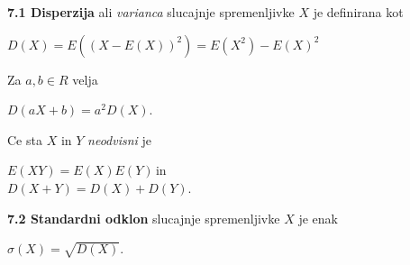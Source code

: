 \documentclass{article}
\begin{document}
\begin{multicols}{3}
\textbf{7.1 Disperzija} ali \textit{varianca} slucajnje spremenljivke $X$
je definirana kot
\begin{center}
    \begin{math}
        D(X) = E((X - E(X))^2) = E(X^2) - E(X)^2
    \end{math}
\end{center}
Za $a, b \in R$ velja
\begin{center}
    \begin{math}
        D(aX + b) = a^2 D(X)
    \end{math}.
\end{center} 
Ce sta $X$ in $Y$ \textit{neodvisni} je 
\begin{center}
    \begin{small}
        \begin{math}
            E(XY) = E(X)E(Y)\,
        \end{math}in \\
        \begin{math}
            D(X + Y) = D(X) + D(Y)
        \end{math}.
    \end{small}
\end{center}

\textbf{7.2 Standardni odklon} slucajnje spremenljivke $X$
je enak 
\begin{center}
    \begin{math}
        \sigma(X) = \sqrt{D(X)}
    \end{math}.
\end{center}

\bigskip

\smallskip
\end{multicols}
\end{document}

